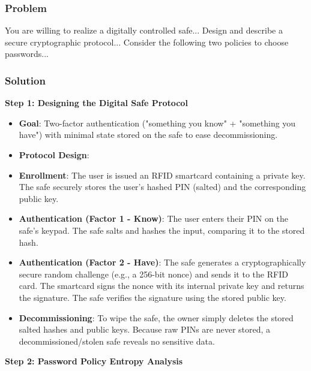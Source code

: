 \documentclass{article}
\begin{document}
\subsubsection*{Problem}
You are willing to realize a digitally controlled safe... Design and describe a secure cryptographic protocol... Consider the following two policies to choose passwords...

\subsubsection*{Solution}
\textbf{Step 1: Designing the Digital Safe Protocol}
\begin{itemize}
    \item \textbf{Goal}: Two-factor authentication ("something you know" + "something you have") with minimal state stored on the safe to ease decommissioning.
    \item \textbf{Protocol Design}:
    \item[\textbf{1.}] \textbf{Enrollment}: The user is issued an RFID smartcard containing a private key. The safe securely stores the user's hashed PIN (salted) and the corresponding public key.
    \item[\textbf{2.}] \textbf{Authentication (Factor 1 - Know)}: The user enters their PIN on the safe's keypad. The safe salts and hashes the input, comparing it to the stored hash.
    \item[\textbf{3.}] \textbf{Authentication (Factor 2 - Have)}: The safe generates a cryptographically secure random challenge (e.g., a 256-bit nonce) and sends it to the RFID card. The smartcard signs the nonce with its internal private key and returns the signature. The safe verifies the signature using the stored public key.
    \item \textbf{Decommissioning}: To wipe the safe, the owner simply deletes the stored salted hashes and public keys. Because raw PINs are never stored, a decommissioned/stolen safe reveals no sensitive data.

\end{itemize}
\textbf{Step 2: Password Policy Entropy Analysis}
\end{document}
